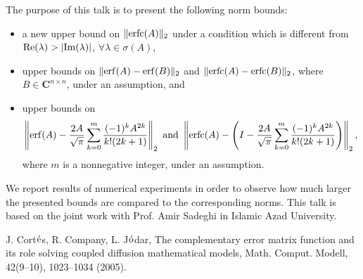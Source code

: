 \documentclass[ILAS2025-program.tex]{subfiles}
\begin{document}
\begin{ilasabstract}
\begin{bibunit}
The purpose of this talk is to present the following norm bounds: 
\begin{itemize}
\item a new upper bound on $\|{\rm erfc}(A)\|_2$ under a condition which is different from ${\rm Re}(\lambda) > |{\rm Im}(\lambda)|$, $\forall \lambda \in \sigma(A)$, 
\item upper bounds on $\|{\rm erf}(A) - {\rm erf}(B)\|_2$ and $\|{\rm erfc}(A) - {\rm erfc}(B)\|_2$, where $B \in \mathbf{C}^{n \times n}$, under an assumption, and 
\item upper bounds on 
$$
\left\|{\rm erf}(A) - \frac{2A}{\sqrt{\pi}}\sum_{k=0}^{m}\frac{(-1)^k A^{2k}}{k! (2k+1)}\right\|_2 \ \mbox{and} \ 
\left\|{\rm erfc}(A) - \left(I - \frac{2A}{\sqrt{\pi}}\sum_{k=0}^{m}\frac{(-1)^kA^{2k}}{k!(2k+1)}\right)\right\|_2,
$$ 
where $m$ is a nonnegative integer, under an assumption. 
\end{itemize}
We report results of numerical experiments in order to observe how much larger the presented bounds are compared to the corresponding norms. 
This talk is based on the joint work with Prof. Amir Sadeghi in Islamic Azad University. 

\begin{thebibliography}{5}
J. Cort$\acute{{\rm e}}$s, R. Company, L. J$\acute{{\rm o}}$dar, 
The complementary error matrix function and its role solving coupled diffusion mathematical models, 
Math. Comput. Modell, 42(9--10), 1023--1034 (2005). 
\end{thebibliography}
        \end{bibunit}
        
\end{ilasabstract}
    
\end{document}
